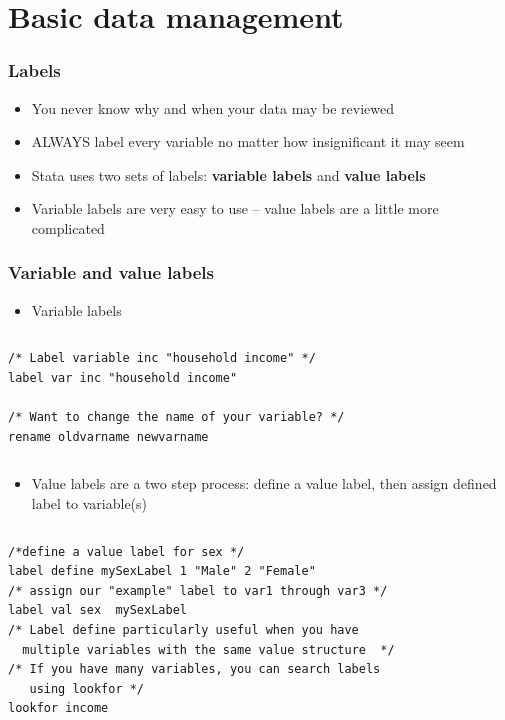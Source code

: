 \documentclass[table]{beamer}
\begin{document}
\section{Basic data management}
\label{sec-4}
\begin{frame}
\frametitle{Labels}
\label{sec-4-1}

\begin{itemize}
\item You never know why and when your data may be reviewed
\item ALWAYS label every variable no matter how insignificant it may seem
\item Stata uses two sets of labels: \textbf{variable labels} and \textbf{value labels}
\item Variable labels are very easy to use -- value labels are a little more complicated
\end{itemize}
\end{frame}
\begin{frame}[fragile]
\frametitle{Variable and value labels}
\label{sec-4-2}

\begin{itemize}
\item Variable labels
\end{itemize}
\vspace{-.5em} \begin{columns}  \begin{block}{}

\begin{verbatim}
/* Label variable inc "household income" */
label var inc "household income"

/* Want to change the name of your variable? */
rename oldvarname newvarname
\end{verbatim}
\end{block} \end{columns}

\begin{itemize}
\item Value labels are a two step process: define a value label, then assign defined label to variable(s)
\end{itemize}

\vspace{-.5em} \begin{columns}  \begin{block}{}

\begin{verbatim}
/*define a value label for sex */
label define mySexLabel 1 "Male" 2 "Female"
/* assign our "example" label to var1 through var3 */
label val sex  mySexLabel
/* Label define particularly useful when you have
  multiple variables with the same value structure  */
/* If you have many variables, you can search labels 
   using lookfor */
lookfor income
\end{verbatim}
\end{block} \end{columns}
\end{frame}
\end{document}
